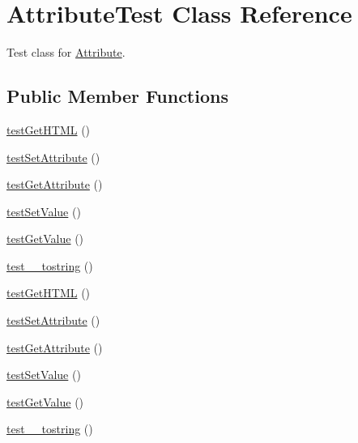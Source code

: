 \hypertarget{class_attribute_test}{
\section{AttributeTest Class Reference}
\label{class_attribute_test}
}


Test class for \hyperlink{class_attribute}{Attribute}.  


\subsection*{Public Member Functions}
\begin{DoxyCompactItemize}
\item 
\hyperlink{class_attribute_test_aa3902f9b64fc94ce37a6e4d5ced87613}{testGetHTML} ()
\item 
\hyperlink{class_attribute_test_a724cb02828c66c6496af557a8ac98112}{testSetAttribute} ()
\item 
\hyperlink{class_attribute_test_a980b593accd006e88ee3a99d5cf3519e}{testGetAttribute} ()
\item 
\hyperlink{class_attribute_test_a55dbd68ed0dd6c1cdcdcff87c21157ab}{testSetValue} ()
\item 
\hyperlink{class_attribute_test_ae129681a24a9257584068dffeef5ab91}{testGetValue} ()
\item 
\hyperlink{class_attribute_test_af55cf9dc36ffc1ebfd356c83380dfea1}{test\_\-\_\-tostring} ()
\item 
\hyperlink{class_attribute_test_aa3902f9b64fc94ce37a6e4d5ced87613}{testGetHTML} ()
\item 
\hyperlink{class_attribute_test_a724cb02828c66c6496af557a8ac98112}{testSetAttribute} ()
\item 
\hyperlink{class_attribute_test_a980b593accd006e88ee3a99d5cf3519e}{testGetAttribute} ()
\item 
\hyperlink{class_attribute_test_a55dbd68ed0dd6c1cdcdcff87c21157ab}{testSetValue} ()
\item 
\hyperlink{class_attribute_test_ae129681a24a9257584068dffeef5ab91}{testGetValue} ()
\item 
\hyperlink{class_attribute_test_af55cf9dc36ffc1ebfd356c83380dfea1}{test\_\-\_\-tostring} ()
\end{DoxyCompactItemize}
